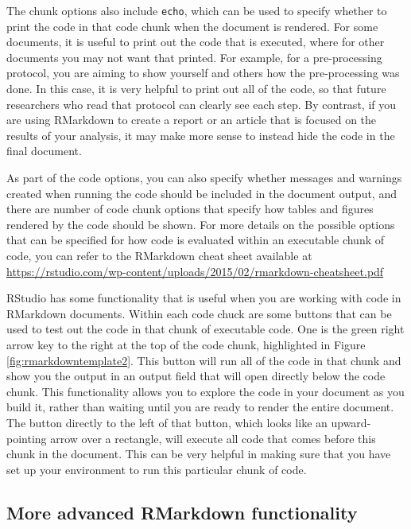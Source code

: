 \documentclass[]{tufte-book}
\begin{document}
The chunk options also include \texttt{echo}, which can be used to specify whether to
print the code in that code chunk when the document is rendered. For some
documents, it is useful to print out the code that is executed, where for other
documents you may not want that printed. For example, for a pre-processing
protocol, you are aiming to show yourself and others how the pre-processing was
done. In this case, it is very helpful to print out all of the code, so that
future researchers who read that protocol can clearly see each step. By
contrast, if you are using RMarkdown to create a report or an article that is
focused on the results of your analysis, it may make more sense to instead hide
the code in the final document.

As part of the code options, you can also specify whether messages and warnings
created when running the code should be included in the document output, and
there are number of code chunk options that specify how tables and figures
rendered by the code should be shown. For more details on the possible options
that can be specified for how code is evaluated within an executable chunk of
code, you can refer to the RMarkdown cheat sheet available at
\url{https://rstudio.com/wp-content/uploads/2015/02/rmarkdown-cheatsheet.pdf}

RStudio has some functionality that is useful when you are working with code in
RMarkdown documents. Within each code chuck are some buttons that can be used to
test out the code in that chunk of executable code. One is the green right arrow
key to the right at the top of the code chunk, highlighted in Figure
\ref{fig:rmarkdowntemplate2}. This button will run all of the code in that
chunk and show you the output in an output field that will open directly below
the code chunk. This functionality allows you to explore the code in your
document as you build it, rather than waiting until you are ready to render the
entire document. The button directly to the left of that button, which looks
like an upward-pointing arrow over a rectangle, will execute all code that comes
before this chunk in the document. This can be very helpful in making sure that
you have set up your environment to run this particular chunk of code.

\subsection{More advanced RMarkdown functionality}\label{more-advanced-rmarkdown-functionality}
\end{document}
